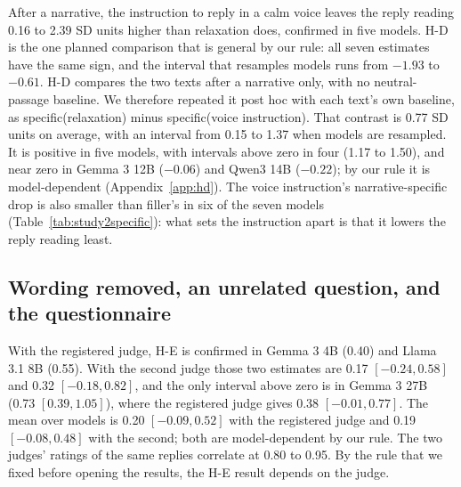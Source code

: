 After a narrative, the instruction to reply in a calm voice leaves the reply reading 0.16 to 2.39 SD
units higher than relaxation does, confirmed in five models.
H-D is the one planned comparison that is general by our rule: all seven estimates have the same
sign, and the interval that resamples models runs from $-1.93$ to $-0.61$.
H-D compares the two texts after a narrative only, with no neutral-passage baseline.
We therefore repeated it post hoc with each text's own baseline, as specific(relaxation) minus
specific(voice instruction).
That contrast is 0.77 SD units on average, with an interval from 0.15 to 1.37 when models are
resampled.
It is positive in five models, with intervals above zero in four (1.17 to 1.50), and near zero in
Gemma 3 12B ($-0.06$) and Qwen3 14B ($-0.22$); by our rule it is model-dependent
(Appendix~\ref{app:hd}).
The voice instruction's narrative-specific drop is also smaller than filler's in six of the seven
models (Table~\ref{tab:study2specific}): what sets the instruction apart is that it lowers the
reply reading least.

\subsection{Wording removed, an unrelated question, and the questionnaire}
\label{sec:s2secondary}
With the registered judge, H-E is confirmed in Gemma 3 4B (0.40) and Llama 3.1 8B (0.55).
With the second judge those two estimates are 0.17 $[-0.24, 0.58]$ and 0.32 $[-0.18, 0.82]$, and the
only interval above zero is in Gemma 3 27B (0.73 $[0.39, 1.05]$), where the registered judge gives 0.38
$[-0.01, 0.77]$.
The mean over models is 0.20 $[-0.09, 0.52]$ with the registered judge and 0.19 $[-0.08, 0.48]$ with
the second; both are model-dependent by our rule.
The two judges' ratings of the same replies correlate at 0.80 to 0.95.
By the rule that we fixed before opening the results, the H-E result depends on the judge.

